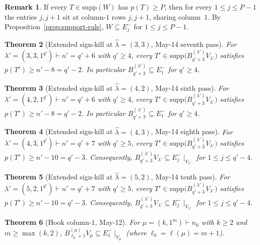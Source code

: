 \documentclass[11pt]{article}
\newtheorem{theorem}{Theorem}
\theoremstyle{definition}
\newtheorem{remark}[theorem]{Remark}
\newcommand{\hatl}{\widehat\lambda}
\newcommand{\supp}{\mathrm{supp}}
\begin{document}
\begin{remark}\label{rem:prefix-implies-Ej-}
If every $T \in \supp(W)$ has $p(T) \ge P$, then for every
$1 \le j \le P - 1$ the entries $j, j+1$ sit at column-$1$ rows
$j, j+1$, sharing column~$1$.  By Proposition~\ref{prop:support-rule},
$W \subseteq E_j^-$ for $1 \le j \le P - 1$.
\end{remark}

\begin{theorem}[Extended sign-kill at $\hatl = (3, 3)$, May-14 seventh pass]\label{thm:33-prefix}
For $\lambda' = (3, 3, 1^{q'}) \vdash n' = q' + 6$ with $q' \ge 4$,
every $T' \in \supp\bigl(B^{(\lambda')}_{q'+3} V_{\lambda'}\bigr)$
satisfies $p(T') \ge n' - 8 = q' - 2$.  In particular
$B^{(\lambda')}_{q'+3} \subseteq E_1^-$ for $q' \ge 4$.
\end{theorem}

\begin{theorem}[Extended sign-kill at $\hatl = (4, 2)$, May-14 sixth pass]\label{thm:42-prefix}
For $\lambda' = (4, 2, 1^{q'}) \vdash n' = q' + 6$ with $q' \ge 4$,
every $T' \in \supp\bigl(B^{(\lambda')}_{q'+3} V_{\lambda'}\bigr)$
satisfies $p(T') \ge n' - 8 = q' - 2$.  In particular
$B^{(\lambda')}_{q'+3} \subseteq E_1^-$ for $q' \ge 4$.
\end{theorem}

\begin{theorem}[Extended sign-kill at $\hatl = (4, 3)$, May-14 eighth pass]\label{thm:43-prefix}
For $\lambda' = (4, 3, 1^{q'}) \vdash n' = q' + 7$ with $q' \ge 5$,
every $T' \in \supp\bigl(B^{(\lambda')}_{q'+3} V_{\lambda'}\bigr)$
satisfies $p(T') \ge n' - 10 = q' - 3$.  Consequently,
$B^{(\lambda')}_{q'+3} V_{\lambda'} \subseteq E_j^-\!\mid_{V_{\lambda'}}$
for $1 \le j \le q' - 4$.
\end{theorem}

\begin{theorem}[Extended sign-kill at $\hatl = (5, 2)$, May-14 tenth pass]\label{thm:52-prefix}
For $\lambda' = (5, 2, 1^{q'}) \vdash n' = q' + 7$ with $q' \ge 5$,
every $T' \in \supp\bigl(B^{(\lambda')}_{q'+3} V_{\lambda'}\bigr)$
satisfies $p(T') \ge n' - 10 = q' - 3$.  Consequently,
$B^{(\lambda')}_{q'+3} V_{\lambda'} \subseteq E_j^-\!\mid_{V_{\lambda'}}$
for $1 \le j \le q' - 4$.
\end{theorem}

\begin{theorem}[Hook column-$1$, May-12]\label{thm:hook-E1minus}
For $\mu = (k, 1^m) \vdash n_0$ with $k \ge 2$ and $m \ge \max(k, 2)$,
$B^{(\mu)}_{\ell_0+1} V_\mu \subseteq E_1^-\!\mid_{V_\mu}$ (where
$\ell_0 = \ell(\mu) = m + 1$).
\end{theorem}
\end{document}
